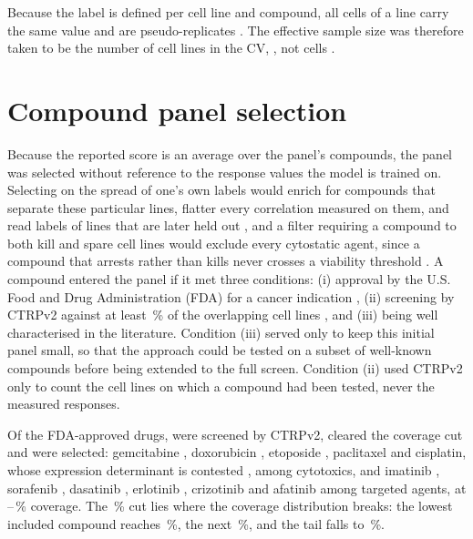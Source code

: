 Because the label is defined per cell line and compound, all cells of a line carry the same value and
are pseudo-replicates \cite{lazic2010}. The effective sample size was therefore taken to be the number of
cell lines in the CV, \NLinesCV{}, not \NCellsCV{} cells \cite{dreval}.

\section{Compound panel selection}
\label{sec:panel}

Because the reported score is an average over the panel's compounds, the panel was selected without
reference to the response values the model is trained on. Selecting on the spread of one's own labels
would enrich for compounds that separate these particular lines, flatter every correlation measured on
them, and read labels of lines that are later held out \cite{dreval}, and a filter requiring a compound
to both kill and spare cell lines would exclude every cytostatic agent, since a compound that arrests
rather than kills never crosses a viability threshold \cite{hafner}. A compound entered
the panel if it met three conditions: (i) approval by the U.S. Food and Drug Administration (FDA) for a
cancer indication \cite{sun_fda}, (ii) screening by CTRPv2 against at least \PanelCovCut\,\% of the
overlapping cell lines \cite{ctrpv2}, and (iii) being well characterised in the literature. Condition
(iii) served only to keep this initial panel small, so that the approach could be tested on a subset of
well-known compounds before being extended to the full screen. Condition (ii) used CTRPv2 only to count
the cell lines on which a compound had been tested, never the measured responses.

Of the FDA-approved drugs, \NFdaScreened{} were screened by CTRPv2, \NFdaCovered{} cleared the coverage
cut and \NPanel{} were selected: gemcitabine \cite{ctrp_rees}, doxorubicin \cite{skinner_abcb1},
etoposide \cite{omori_abcb1,skinner_abcb1}, paclitaxel \cite{ctrpv2,skinner_abcb1} and cisplatin, whose expression determinant is contested
\cite{britten_ercc1,shimizu_ercc1,friboulet_ercc1}, among cytotoxics, and imatinib
\cite{ctrp_rees,skinner_abcb1}, sorafenib \cite{scp542}, dasatinib \cite{ctrpv2}, erlotinib
\cite{scdeal,pao2004}, crizotinib \cite{ctrpv2} and afatinib \cite{ctrpv2} among targeted agents, at \PanelCovLo--\PanelCovHi\,\% coverage. The \PanelCovCut\,\% cut lies where the coverage
distribution breaks: the lowest included compound reaches \CovLowestIn\,\%, the next \CovNextOut\,\%, and
the tail falls to \CovTail\,\%.

